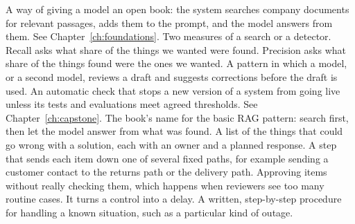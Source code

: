 \begin{description}[style=nextline, leftmargin=1.2em, itemsep=4pt, font=\normalfont\bfseries\sffamily\small]
 A way of giving a model an open book: the system searches company documents for relevant passages, adds them to the prompt, and the model answers from them. See Chapter~\ref{ch:foundations}.
 Two measures of a search or a detector. Recall asks what share of the things we wanted were found. Precision asks what share of the things found were the ones we wanted.
 A pattern in which a model, or a second model, reviews a draft and suggests corrections before the draft is used.
 An automatic check that stops a new version of a system from going live unless its tests and evaluations meet agreed thresholds. See Chapter~\ref{ch:capstone}.
 The book's name for the basic RAG pattern: search first, then let the model answer from what was found.
 A list of the things that could go wrong with a solution, each with an owner and a planned response.
 A step that sends each item down one of several fixed paths, for example sending a customer contact to the returns path or the delivery path.
 Approving items without really checking them, which happens when reviewers see too many routine cases. It turns a control into a delay.
 A written, step-by-step procedure for handling a known situation, such as a particular kind of outage.


\end{description}

